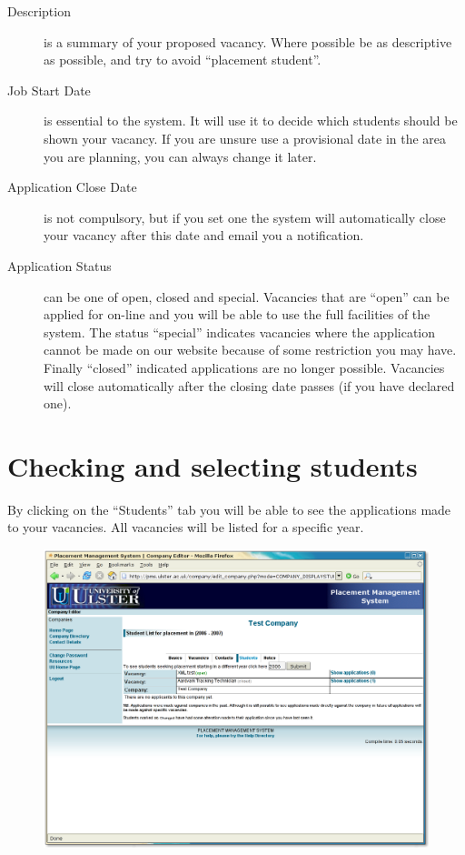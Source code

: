 \documentclass{article}
\begin{document}
\begin{description}
\item[Description] is a summary of your proposed vacancy. Where
possible be as descriptive as possible, and try to avoid
``placement student''.
\item[Job Start Date] is essential to the system. It will use it to
decide which students should be shown your vacancy. If you are 
unsure use a provisional date in the area you are planning, you
can always change it later.
\item[Application Close Date] is not compulsory, but if you set
one the system will automatically close your vacancy after this
date and email you a notification.
\item[Application Status] can be one of open, closed and special.
Vacancies that are ``open'' can be applied for on-line and you
will be able to use the full facilities of the system. The
status ``special'' indicates vacancies where the application
cannot be made on our website because of some restriction you
may have. Finally ``closed'' indicated applications are no
longer possible. Vacancies will close automatically after the
closing date passes (if you have declared one).
\end{description}

\section{Checking and selecting students}

By clicking on the ``Students'' tab you will be able to see
the applications made to your vacancies. All vacancies will be
listed for a specific year.
\begin{figure}[htb]
\begin{center}
\includegraphics[scale=0.25]{png/company_hr5.png}
\end{center}
\end{figure}
\end{document}
